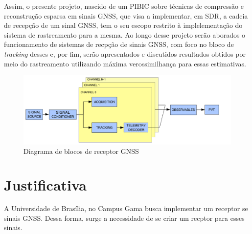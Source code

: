 



Assim, o presente projeto, nascido de um PIBIC sobre técnicas de compressão e reconstrução esparsa em sinais GNSS, que visa a implementar, em SDR, a cadeia de recepção de um sinal GNSS, tem o seu escopo restrito à implelementação do sistema de rastreamento para a mesma. Ao longo desse projeto serão aborados o funcionamento de sistemas de recpção de sinais GNSS, com foco no bloco de \textit{tracking} desses e, por fim, serão apresentados e discutidos resultados obtidos por meio do rastreamento utilizando máxima verossimilhança para essas estimativas.
\begin{figure}[h]
    \centering
    \includegraphics[width = \textwidth]{figuras/simple-gnss-sdr-flowgraph.png}
    \caption{Diagrama de blocos de receptor GNSS}
    \label{fig:GNSS_flow_graph}
\end{figure}

\section{Justificativa}

A Universidade de Brasília, no Campus Gama busca implementar um receptor se sinais GNSS. Dessa forma, surge a necessidade de se criar um recptor para esses sinais.


